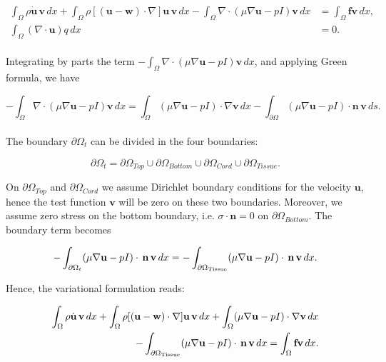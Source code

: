 \documentclass[11pt,a4paper,titlepage]{report}
\begin{document}
\begin{align}
\int_{\Omega} \rho \dot{\mathbf{u}} \, \mathbf{v} \, dx
+ \int_{\Omega} \rho [(\mathbf{u - w}) \cdot \nabla] \mathbf{u} \, \mathbf{v} \, dx
- \int_{\Omega} \nabla \cdot (\mu \nabla \mathbf{u} - pI)\mathbf{v} \, dx
&= \int_{\Omega} \mathbf{f} \mathbf{v} \, dx, \\
\int_{\Omega}  (\nabla \cdot \mathbf{u}) q \, dx &= 0.
\end{align}
\\
Integrating by parts the term $- \int_{\Omega} \nabla \cdot (\mu \nabla \mathbf{u} - pI)\mathbf{v} \, dx$, and applying Green formula, we have

\[
- \int_{\Omega} \nabla \cdot (\mu \nabla \mathbf{u} - pI)\mathbf{v} \, dx =  \int_{\Omega} (\mu \nabla \mathbf{u} - pI) \cdot \nabla \mathbf{v} \, dx - \int_{\partial \Omega} (\mu \nabla \mathbf{u} - pI) \cdot \mathbf{n} \, \mathbf{v} \, ds.
\]
\\
The boundary $\partial \Omega_t$ can be divided in the four boundaries:

\[
\partial \Omega_t= \partial \Omega_{Top} \cup \partial \Omega_{Bottom} \cup \partial \Omega_{Cord} \cup  \partial \Omega_{Tissue}.
\]

On $\partial \Omega_{Top}$ and $\partial \Omega_{Cord}$ we assume Dirichlet boundary conditions for the velocity $\mathbf{u}$, hence the test function $\mathbf{v}$ will be zero on these two boundaries. Moreover, we assume zero stress on the bottom boundary, i.e. $\sigma \cdot \mathbf{n} = 0$ on $\partial \Omega_{Bottom}$. The boundary term becomes

\[
- \int_{\partial \Omega_t} (\mu \nabla \mathbf{u} - p I) \cdot \, \mathbf{n} \, \mathbf{v} \, dx =
- \int_{\partial \Omega_{\rm Tissue}} (\mu \nabla \mathbf{u} - p I) \cdot \, \mathbf{n} \, \mathbf{v} \, dx.
\]

Hence, the variational formulation reads:

\begin{equation}
\label{eq:ns:5}
\begin{split}
\int_{\Omega} \rho \dot{\mathbf{u}} \, \mathbf{v} \, dx
+ \int_{\Omega} \rho [(\mathbf{u - w}) \cdot \nabla] \mathbf{u} \, \mathbf{v} \, dx
+ \int_{\Omega} (\mu \nabla \mathbf{u} - pI) \cdot \nabla \mathbf{v} \, dx \\
- \int_{\partial \Omega_{\rm Tissue}} (\mu \nabla \mathbf{u} - p I) \cdot \, \mathbf{n} \, \mathbf{v} \, dx
=  \int_{\Omega} \mathbf{f} \mathbf{v} \, dx.
\end{split}
\end{equation}
\end{document}
